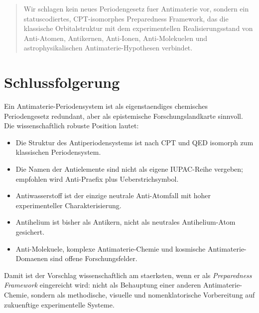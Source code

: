 \documentclass[11pt,a4paper]{article}
\begin{document}
\begin{quote}
Wir schlagen kein neues Periodengesetz fuer Antimaterie vor, sondern ein statuscodiertes, CPT-isomorphes Preparedness Framework, das die klassische Orbitalstruktur mit dem experimentellen Realisierungsstand von Anti-Atomen, Antikernen, Anti-Ionen, Anti-Molekuelen und astrophysikalischen Antimaterie-Hypothesen verbindet.
\end{quote}

\section{Schlussfolgerung}

Ein Antimaterie-Periodensystem ist als eigenstaendiges chemisches Periodengesetz redundant, aber als epistemische Forschungslandkarte sinnvoll. Die wissenschaftlich robuste Position lautet:

\begin{itemize}
  \item Die Struktur des Antiperiodensystems ist nach CPT und QED isomorph zum klassischen Periodensystem.
  \item Die Namen der Antielemente sind nicht als eigene IUPAC-Reihe vergeben; empfohlen wird Anti-Praefix plus Ueberstrichsymbol.
  \item Antiwasserstoff ist der einzige neutrale Anti-Atomfall mit hoher experimenteller Charakterisierung.
  \item Antihelium ist bisher als Antikern, nicht als neutrales Antihelium-Atom gesichert.
  \item Anti-Molekuele, komplexe Antimaterie-Chemie und kosmische Antimaterie-Domaenen sind offene Forschungsfelder.
\end{itemize}

Damit ist der Vorschlag wissenschaftlich am staerksten, wenn er als \emph{Preparedness Framework} eingereicht wird: nicht als Behauptung einer anderen Antimaterie-Chemie, sondern als methodische, visuelle und nomenklatorische Vorbereitung auf zukuenftige experimentelle Systeme.
\end{document}
